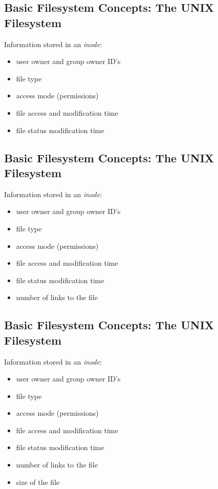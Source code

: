 \documentclass[xga]{xdvislides}
\begin{document}
\subsection{Basic Filesystem Concepts: The UNIX Filesystem}
Information stored in an {\em inode}:
\begin{itemize}
	\item user owner and group owner ID's
	\item file type
	\item access mode (permissions)
	\item file access and modification time
	\item file status modification time
\end{itemize}

\subsection{Basic Filesystem Concepts: The UNIX Filesystem}
Information stored in an {\em inode}:
\begin{itemize}
	\item user owner and group owner ID's
	\item file type
	\item access mode (permissions)
	\item file access and modification time
	\item file status modification time
	\item number of links to the file
\end{itemize}

\subsection{Basic Filesystem Concepts: The UNIX Filesystem}
Information stored in an {\em inode}:
\begin{itemize}
	\item user owner and group owner ID's
	\item file type
	\item access mode (permissions)
	\item file access and modification time
	\item file status modification time
	\item number of links to the file
	\item size of the file
\end{itemize}
\end{document}

